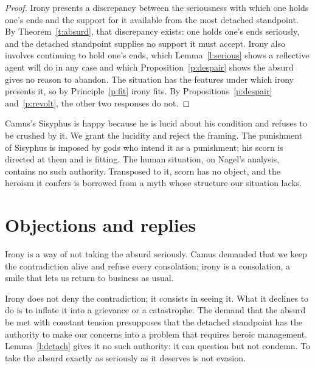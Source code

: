 \documentclass{situationist-preprint}
\begin{document}
\begin{proof}
Irony presents a discrepancy between the seriousness with which one holds one's ends and the support for it available from the most detached standpoint. By Theorem~\ref{t:absurd}, that discrepancy exists: one holds one's ends seriously, and the detached standpoint supplies no support it must accept. Irony also involves continuing to hold one's ends, which Lemma~\ref{l:serious} shows a reflective agent will do in any case and which Proposition~\ref{p:despair} shows the absurd gives no reason to abandon. The situation has the features under which irony presents it, so by Principle~\ref{p:fit} irony fits. By Propositions~\ref{p:despair} and~\ref{p:revolt}, the other two responses do not.
\end{proof}

\begin{remark}\label{r:camus}
Camus's Sisyphus is happy because he is lucid about his condition and refuses to be crushed by it. We grant the lucidity and reject the framing. The punishment of Sisyphus is imposed by gods who intend it as a punishment; his scorn is directed at them and is fitting. The human situation, on Nagel's analysis, contains no such authority. Transposed to it, scorn has no object, and the heroism it confers is borrowed from a myth whose structure our situation lacks.
\end{remark}

\section{Objections and replies}

\begin{objection}[Evasion]\label{o:evasion}
Irony is a way of not taking the absurd seriously. Camus demanded that we keep the contradiction alive and refuse every consolation; irony is a consolation, a smile that lets us return to business as usual.
\end{objection}

\begin{reply}
Irony does not deny the contradiction; it consists in seeing it. What it declines to do is to inflate it into a grievance or a catastrophe. The demand that the absurd be met with constant tension presupposes that the detached standpoint has the authority to make our concerns into a problem that requires heroic management. Lemma~\ref{l:detach} gives it no such authority: it can question but not condemn. To take the absurd exactly as seriously as it deserves is not evasion.
\end{reply}
\end{document}
